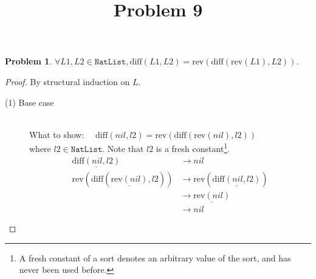\documentclass[12pt, a4paper]{article}
\title{Problem 9}
\date{\vspace{-5ex}}
\newtheorem{problem}{Problem}
\newcommand{\rmx}[1]{\mathrm{#1}}
\newcommand{\larrow}{\longrightarrow}
\newcommand{\under}{\underline}
\begin{document}
\maketitle

\begin{problem}
$\forall L1, L2 \in \mathtt{NatList}, \rmx{diff}(L1, L2) = \rmx{rev}(\rmx{diff}(\rmx{rev}(L1), L2))$.
\end{problem}
\begin{proof}
By structural induction on $L$.

\begin{description}
\item[(1) Base case]~\\
\noindent
What to show: $\quad \rmx{diff}(nil, l2) = \rmx{rev}(\rmx{diff}(\rmx{rev}(nil), l2))$ \\
where $l2 \in \mathtt{NatList}$.
Note that $l2$ is a fresh constant\footnote{A fresh constant of a sort denotes an arbitrary value of the sort, and has never been used before.}.
\begin{align*}
\under{\rmx{diff}(nil, l2)}
	&\larrow nil \tag{by diff1} \\
\rmx{rev}(\rmx{diff}(\under{\rmx{rev}(nil)}, l2))
	&\larrow \rmx{rev}(\under{\rmx{diff}(nil, l2)}) \tag{by rev1} \\
	&\larrow \under{\rmx{rev}(nil)} \tag{by diff1} \\
	&\larrow nil \tag{by rev1}
\end{align*}


\end{description}
\end{proof}
\end{document}

